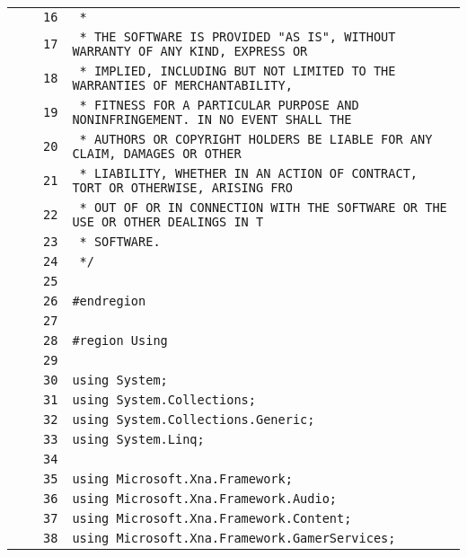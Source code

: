 \documentclass[a4paper,10pt]{article}
\begin{document}
\begin{longtable}[l]{lrrl}
\cellcolor{gray} &  & \verb~16~ & \verb~ *~\\
\cellcolor{gray} &  & \verb~17~ & \verb~ * THE SOFTWARE IS PROVIDED "AS IS", WITHOUT WARRANTY OF ANY KIND, EXPRESS OR~\\
\cellcolor{gray} &  & \verb~18~ & \verb~ * IMPLIED, INCLUDING BUT NOT LIMITED TO THE WARRANTIES OF MERCHANTABILITY,~\\
\cellcolor{gray} &  & \verb~19~ & \verb~ * FITNESS FOR A PARTICULAR PURPOSE AND NONINFRINGEMENT. IN NO EVENT SHALL THE~\\
\cellcolor{gray} &  & \verb~20~ & \verb~ * AUTHORS OR COPYRIGHT HOLDERS BE LIABLE FOR ANY CLAIM, DAMAGES OR OTHER~\\
\cellcolor{gray} &  & \verb~21~ & \verb~ * LIABILITY, WHETHER IN AN ACTION OF CONTRACT, TORT OR OTHERWISE, ARISING FRO~\\
\cellcolor{gray} &  & \verb~22~ & \verb~ * OUT OF OR IN CONNECTION WITH THE SOFTWARE OR THE USE OR OTHER DEALINGS IN T~\\
\cellcolor{gray} &  & \verb~23~ & \verb~ * SOFTWARE.~\\
\cellcolor{gray} &  & \verb~24~ & \verb~ */~\\
\cellcolor{gray} &  & \verb~25~ & \verb~~\\
\cellcolor{gray} &  & \verb~26~ & \verb~#endregion~\\
\cellcolor{gray} &  & \verb~27~ & \verb~~\\
\cellcolor{gray} &  & \verb~28~ & \verb~#region Using~\\
\cellcolor{gray} &  & \verb~29~ & \verb~~\\
\cellcolor{gray} &  & \verb~30~ & \verb~using System;~\\
\cellcolor{gray} &  & \verb~31~ & \verb~using System.Collections;~\\
\cellcolor{gray} &  & \verb~32~ & \verb~using System.Collections.Generic;~\\
\cellcolor{gray} &  & \verb~33~ & \verb~using System.Linq;~\\
\cellcolor{gray} &  & \verb~34~ & \verb~~\\
\cellcolor{gray} &  & \verb~35~ & \verb~using Microsoft.Xna.Framework;~\\
\cellcolor{gray} &  & \verb~36~ & \verb~using Microsoft.Xna.Framework.Audio;~\\
\cellcolor{gray} &  & \verb~37~ & \verb~using Microsoft.Xna.Framework.Content;~\\
\cellcolor{gray} &  & \verb~38~ & \verb~using Microsoft.Xna.Framework.GamerServices;~\\

\end{longtable}
\end{document}
